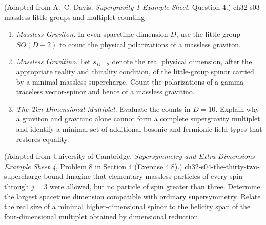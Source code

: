 \begin{enumerate}
    {(Adapted from A.~C. Davis, \emph{Supergravity 1 Example Sheet}, Question 4.)}
    {ch32-s03-massless-little-groups-and-multiplet-counting}
  \begin{enumerate}
    \item \emph{Massless Graviton.}
    In even spacetime dimension \(D\), use the little group \(SO(D-2)\) to
      count the physical polarizations of a massless graviton.
    \item \emph{Massless Gravitino.}
    Let \(s_{D-2}\) denote the real physical dimension, after the appropriate
      reality and chirality condition, of the little-group spinor carried by
      a minimal massless supercharge.  Count the polarizations of a
      gamma-traceless vector-spinor and hence of a massless gravitino.
    \item \emph{The Ten-Dimensional Multiplet.}
    Evaluate the counts in \(D=10\).  Explain why a graviton and gravitino
      alone cannot form a complete supergravity multiplet and identify a
      minimal set of additional bosonic and fermionic field types that
      restores equality.
  \end{enumerate}

    {(Adapted from University of Cambridge, \emph{Supersymmetry and Extra Dimensions Example Sheet 4}, Problem 8 in Section 4 (Exercise 4.8).)}
    {ch32-s04-the-thirty-two-supercharge-bound}
Imagine that elementary massless particles of every spin through
  \(j=3\) were allowed, but no particle of spin greater than three.
  Determine the largest spacetime dimension compatible with ordinary
  supersymmetry.  Relate the real size of a minimal higher-dimensional
  spinor to the helicity span of the four-dimensional multiplet obtained by
  dimensional reduction.


\end{enumerate}
